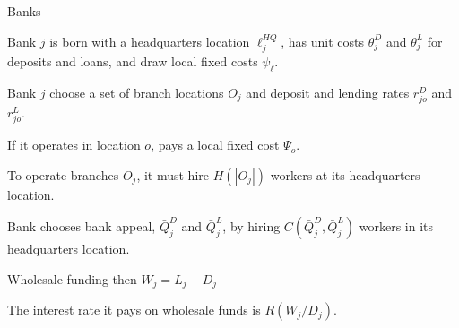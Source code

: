 \documentclass[notes,10pt, aspectratio=169]{beamer}
\newenvironment{wideitemize}{\itemize\addtolength{\itemsep}{10pt}}{\enditemize}
\begin{document}
\begin{frame}{Banks}

    \begin{wideitemize}
        \item Bank $j$ is born with a headquarters location $\ell_j^{H Q}$, has unit costs $\theta_j^D$ and $\theta_j^L$ for deposits and loans, and draw local fixed costs $\psi_{\ell}$.
        \item Bank $j$ choose a set of branch locations $O_j$ and deposit and lending rates $r_{j o}^D$ and $r_{j o}^L$.
        \item If it operates in location $o$,  pays a local fixed cost $\Psi_o$.
        \item To operate branches $O_j$, it must hire $H\left(\left|O_j\right|\right)$ workers at its headquarters location.
        \item Bank chooses bank appeal, $\bar{Q}_j^D$ and $\bar{Q}_j^L$, by hiring $C\left(\bar{Q}_j^D, \bar{Q}_j^L\right)$ workers in its headquarters location.
        \item Wholesale funding then $W_j=L_j -D_j$
        \item The interest rate it pays on wholesale funds is $R\left(W_j/D_j\right)$.

    \end{wideitemize}
        
        


\end{frame}
\end{document}
